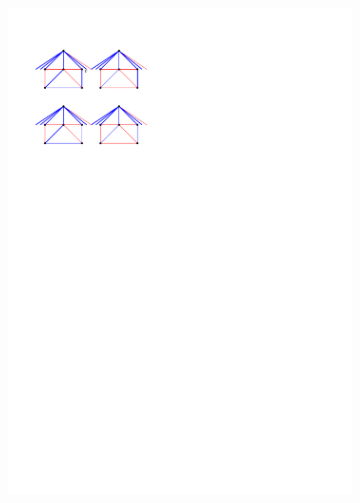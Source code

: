 \begin{figure}
    \centering
    \begin{subfigure}[b]{0.45 \textwidth}
        \includegraphics[width = \textwidth]{chordReplace/img/continueSingleTopFan}
        \caption{}
        \label{fig:replace:continueSingleTopFan}
    \end{subfigure}
    ~
    \begin{subfigure}[b]{0.45 \textwidth}

\end{subfigure}
\end{figure}
